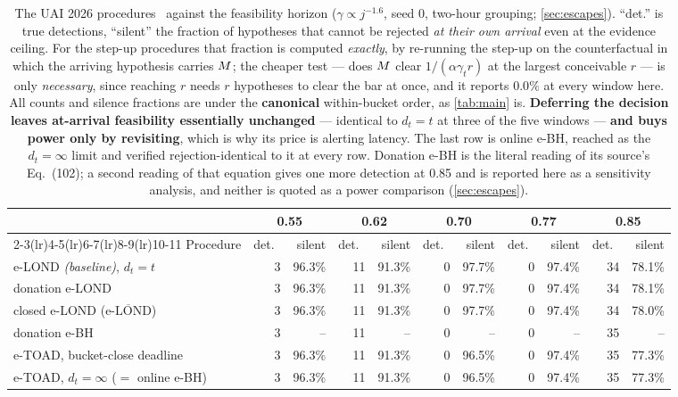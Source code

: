 \begin{table}[t]
\centering
\caption{The UAI 2026 procedures~\cite{xu2026eclosure} against the feasibility horizon
($\gamma\propto j^{-1.6}$, seed 0, two-hour grouping; \cref{sec:escapes}). ``det.'' is true
detections, ``silent'' the fraction of hypotheses that cannot be rejected \emph{at their own
arrival} even at the evidence ceiling. For the step-up procedures that fraction is computed
\emph{exactly}, by re-running the step-up on the counterfactual in which the arriving hypothesis
carries $M$; the cheaper test --- does $M$ clear $1/(\alpha\gamma_t r)$ at the largest
conceivable $r$ --- is only \emph{necessary}, since reaching $r$ needs $r$ hypotheses to clear the
bar at once, and it reports $0.0\%$ at every window here. All counts and silence fractions are under
the \textbf{canonical} within-bucket order, as \cref{tab:main} is. \textbf{Deferring the decision
leaves at-arrival feasibility essentially unchanged} --- identical to $d_t=t$ at three of the five windows
--- \textbf{and buys power only by revisiting}, which is why its price is alerting latency. The
last row is online e-BH, reached as the $d_t=\infty$ limit and verified rejection-identical to it at
every row. Donation e-BH is the literal reading of its source's Eq.~(102); a second
reading of that equation gives one more detection at 0.85 and is reported here as a sensitivity
analysis, and neither is quoted as a power comparison (\cref{sec:escapes}).}
\label{apptab:uai26}
\begin{tabular}{lrrrrrrrrrr}
\toprule
 & \multicolumn{2}{c}{0.55} & \multicolumn{2}{c}{0.62} & \multicolumn{2}{c}{0.70} & \multicolumn{2}{c}{0.77} & \multicolumn{2}{c}{0.85} \\
\cmidrule(lr){2-3}\cmidrule(lr){4-5}\cmidrule(lr){6-7}\cmidrule(lr){8-9}\cmidrule(lr){10-11}
Procedure & det.\ & silent & det.\ & silent & det.\ & silent & det.\ & silent & det.\ & silent \\
\midrule
e-LOND \emph{(baseline)}, $d_t=t$ & 3 & 96.3\% & 11 & 91.3\% & 0 & 97.7\% & 0 & 97.4\% & 34 & 78.1\% \\
donation e-LOND & 3 & 96.3\% & 11 & 91.3\% & 0 & 97.7\% & 0 & 97.4\% & 34 & 78.1\% \\
closed e-LOND ($\overline{\text{e-LOND}}$) & 3 & 96.3\% & 11 & 91.3\% & 0 & 97.7\% & 0 & 97.4\% & 34 & 78.0\% \\
donation e-BH & 3 & -- & 11 & -- & 0 & -- & 0 & -- & 35 & -- \\
e-TOAD, bucket-close deadline & 3 & 96.3\% & 11 & 91.3\% & 0 & 96.5\% & 0 & 97.4\% & 35 & 77.3\% \\
e-TOAD, $d_t=\infty$ ($=$ online e-BH) & 3 & 96.3\% & 11 & 91.3\% & 0 & 96.5\% & 0 & 97.4\% & 35 & 77.3\% \\
\bottomrule
\end{tabular}
\end{table}
